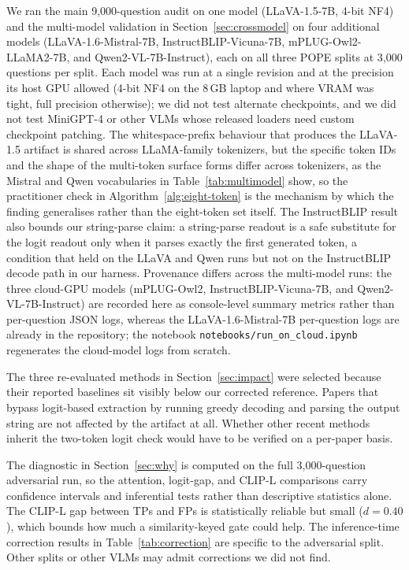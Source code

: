 \documentclass[11pt,letterpaper]{article}
\begin{document}
We ran the main 9{,}000-question audit on one model
(LLaVA-1.5-7B, 4-bit NF4) and the multi-model validation in
Section~\ref{sec:crossmodel} on four additional models
(LLaVA-1.6-Mistral-7B, InstructBLIP-Vicuna-7B, mPLUG-Owl2-LLaMA2-7B,
and Qwen2-VL-7B-Instruct), each on all three POPE splits at 3{,}000
questions per split. Each model was run at a single revision and at the
precision its host GPU allowed (4-bit NF4 on the 8\,GB laptop and where
VRAM was tight, full precision otherwise); we did not test alternate
checkpoints, and we did not test MiniGPT-4 or other VLMs whose released
loaders need custom checkpoint patching. The whitespace-prefix
behaviour that produces the LLaVA-1.5 artifact is shared across
LLaMA-family tokenizers, but the specific token IDs and the shape of
the multi-token surface forms differ across tokenizers, as the Mistral
and Qwen vocabularies in Table~\ref{tab:multimodel} show, so the
practitioner check in Algorithm~\ref{alg:eight-token} is the mechanism
by which the finding generalises rather than the eight-token set
itself. The InstructBLIP result also bounds our string-parse claim: a
string-parse readout is a safe substitute for the logit readout only
when it parses exactly the first generated token, a condition that held
on the LLaVA and Qwen runs but not on the InstructBLIP decode path in
our harness. Provenance differs across the multi-model runs: the three
cloud-GPU models (mPLUG-Owl2, InstructBLIP-Vicuna-7B, and
Qwen2-VL-7B-Instruct) are recorded here as console-level summary metrics
rather than per-question JSON logs, whereas the LLaVA-1.6-Mistral-7B
per-question logs are already in the repository; the notebook
\texttt{notebooks/run\_on\_cloud.ipynb} regenerates the cloud-model logs
from scratch.

The three re-evaluated methods in Section~\ref{sec:impact} were
selected because their reported baselines sit visibly below our
corrected reference. Papers that bypass logit-based extraction by
running greedy decoding and parsing the output string are not affected
by the artifact at all. Whether other recent methods inherit the
two-token logit check would have to be verified on a per-paper basis.

The diagnostic in Section~\ref{sec:why} is computed on the full
3,000-question adversarial run, so the attention, logit-gap, and CLIP-L
comparisons carry confidence intervals and inferential tests rather
than descriptive statistics alone. The CLIP-L gap between TPs and FPs
is statistically reliable but small ($d=0.40$), which bounds how much a
similarity-keyed gate could help. The inference-time
correction results in Table~\ref{tab:correction} are specific to the
adversarial split. Other splits or other VLMs may admit corrections we
did not find.
\end{document}
